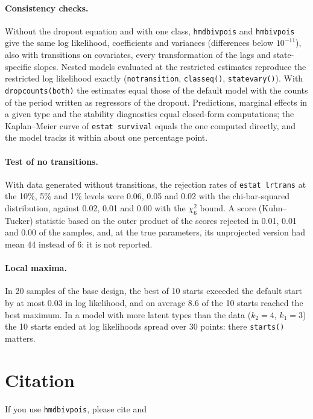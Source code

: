 \documentclass[11pt,a4paper]{article}
\newcommand{\cmd}[1]{\texttt{#1}}
\begin{document}
\paragraph{Consistency checks.} Without the dropout equation and with one class, \cmd{hmdbivpois} and
\cmd{hmbivpois} give the same log likelihood, coefficients and variances (differences below $10^{-11}$),
also with transitions on covariates, every transformation of the lags and state-specific slopes. Nested
models evaluated at the restricted estimates reproduce the restricted log likelihood exactly
(\cmd{notransition}, \cmd{classeq()}, \cmd{statevary()}). With \cmd{dropcounts(both)} the estimates
equal those of the default model with the counts of the period written as regressors of the dropout.
Predictions, marginal effects in a given type and the stability diagnostics equal closed-form
computations; the Kaplan--Meier curve of \cmd{estat survival} equals the one computed directly, and the
model tracks it within about one percentage point.

\paragraph{Test of no transitions.} With data generated without transitions, the rejection rates of
\cmd{estat lrtrans} at the 10\%, 5\% and 1\% levels were 0.06, 0.05 and 0.02 with the chi-bar-squared
distribution, against 0.02, 0.01 and 0.00 with the $\chi^2_6$ bound. A score (Kuhn--Tucker) statistic
based on the outer product of the scores rejected in 0.01, 0.01 and 0.00 of the samples, and, at the true
parameters, its unprojected version had mean 44 instead of 6: it is not reported.

\paragraph{Local maxima.} In 20 samples of the base design, the best of 10 starts exceeded the default
start by at most 0.03 in log likelihood, and on average 8.6 of the 10 starts reached the best maximum. In
a model with more latent types than the data ($k_2=4$, $k_1=3$) the 10 starts ended at log likelihoods
spread over 30 points: there \cmd{starts()} matters.

\section*{Citation}
If you use \cmd{hmdbivpois}, please cite \citet{carrieri2026} and
\end{document}
